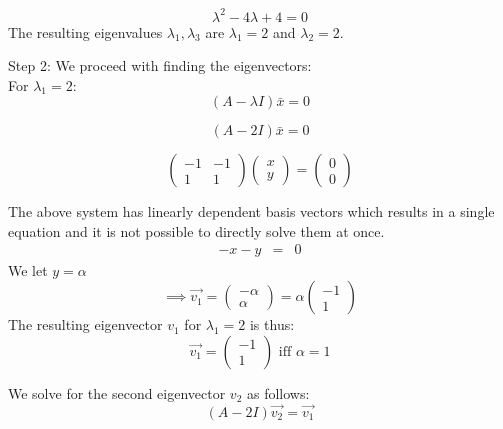 \documentclass[12pt,a4paper]{article}
\begin{document}
\begin{enumerate}
    \begin{equation*}
    \lambda^2 - 4\lambda + 4=0  
    \end{equation*}
     The resulting eigenvalues $\lambda_1, \lambda_3$  are $\lambda_1 = 2 $ and $\lambda_2 = 2 $.

    Step 2: We proceed with finding the eigenvectors:\\
    For   $\lambda_1 = 2 $:
    \begin{equation*}
    \left(A- \lambda I \right)\bar{x} =0 
    \end{equation*}


    \begin{equation*}
    \left(A -2 I \right)\bar{x} =0 
    \end{equation*}

    \[ 
      \begin{pmatrix} -1 & -1 \\ 1 & 1 \end{pmatrix} 
      \begin{pmatrix} x \\ y \end{pmatrix}
      =\begin{pmatrix} 0 \\ 0 \end{pmatrix}
    \]

The above system has linearly dependent basis vectors which results in a single equation and it is not possible to directly solve them at once.
  \begin{eqnarray*}
  -x - y &=&0
  \end{eqnarray*}
   We let $y=\alpha $
   \[ 
   \implies  \vec{v_1}=\begin{pmatrix} -\alpha \\ \alpha \end{pmatrix}
    =\alpha \begin{pmatrix} -1 \\ 1 \end{pmatrix}
  \]
  The resulting  eigenvector $v_1$  for  $\lambda_1 =2$ is thus: 
  \[ 
    \vec{v_1}= \begin{pmatrix} -1 \\ 1 \end{pmatrix} \text{  iff  } \alpha=1
  \]

   
We solve for the second eigenvector $v_2$ as follows:
  \begin{equation*}
  \left(A -2 I \right)\vec{v_2} =\vec{v_1} 
  \end{equation*}
  

\end{enumerate}
\end{document}
